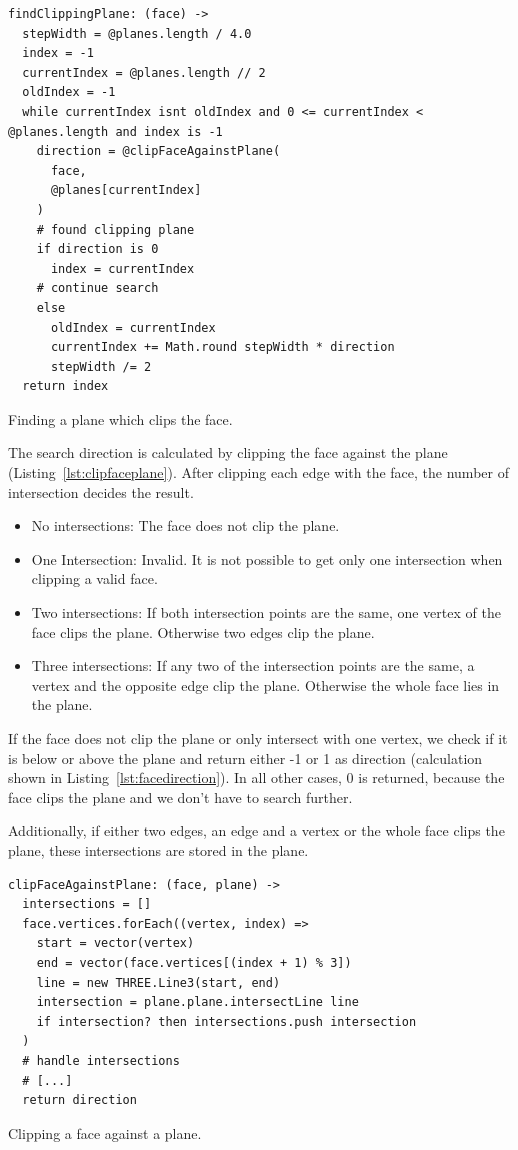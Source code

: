 \documentclass[../ClassicThesis.tex]{subfiles}
\begin{document}
\begin{listing}
\begin{verbatim}
findClippingPlane: (face) ->
  stepWidth = @planes.length / 4.0
  index = -1
  currentIndex = @planes.length // 2
  oldIndex = -1
  while currentIndex isnt oldIndex and 0 <= currentIndex < @planes.length and index is -1
    direction = @clipFaceAgainstPlane(
      face, 
      @planes[currentIndex]
    )
    # found clipping plane
    if direction is 0
      index = currentIndex
    # continue search
    else
      oldIndex = currentIndex
      currentIndex += Math.round stepWidth * direction
      stepWidth /= 2
  return index
\end{verbatim}
\caption{Finding a plane which clips the face.}
\label{lst:findplane}
\end{listing}

The search direction is calculated by clipping the face against the plane (Listing~\ref{lst:clipfaceplane}). After clipping each edge with the face, the number of intersection decides the result.

\begin{itemize}
  \item No intersections: The face does not clip the plane.
  \item One Intersection: Invalid. It is not possible to get only one intersection when clipping a valid face.
  \item Two intersections: If both intersection points are the same, one vertex of the face clips the plane. Otherwise two edges clip the plane.
  \item Three intersections: If any two of the intersection points are the same, a vertex and the opposite edge clip the plane. Otherwise the whole face lies in the plane.
\end{itemize}

If the face does not clip the plane or only intersect with one vertex, we check if it is below or above the plane and return either -1 or 1 as direction (calculation shown in Listing~\ref{lst:facedirection}). In all other cases, 0 is returned, because the face clips the plane and we don't have to search further. 

Additionally, if either two edges, an edge and a vertex or the whole face clips the plane, these intersections are stored in the plane.

\begin{listing}
\begin{verbatim}
clipFaceAgainstPlane: (face, plane) ->
  intersections = []
  face.vertices.forEach((vertex, index) =>
    start = vector(vertex)
    end = vector(face.vertices[(index + 1) % 3])
    line = new THREE.Line3(start, end)
    intersection = plane.plane.intersectLine line
    if intersection? then intersections.push intersection
  )
  # handle intersections
  # [...]
  return direction
\end{verbatim}
\caption{Clipping a face against a plane.}
\label{lst:clipfaceplane}
\end{listing}
\end{document}
